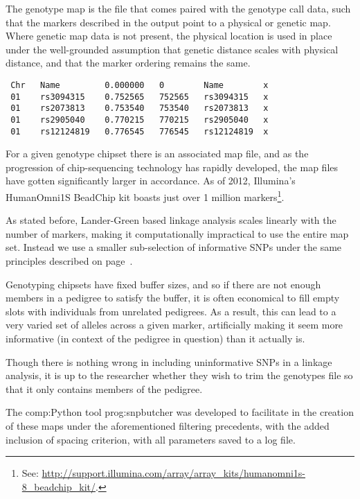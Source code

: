 The genotype map is the file that comes paired with the genotype call data, such that the markers described in the output point to a physical or genetic map. Where genetic map data is not present, the physical location is used in place under the well-grounded assumption that genetic distance scales with physical distance, and that the marker ordering remains the same.

\begingroup
\vspace{10pt}
\begin{lstlisting}
 Chr   Name         0.000000   0        Name        x
 01    rs3094315    0.752565   752565   rs3094315   x
 01    rs2073813    0.753540   753540   rs2073813   x
 01    rs2905040    0.770215   770215   rs2905040   x
 01    rs12124819   0.776545   776545   rs12124819  x
\end{lstlisting}
\vspace{-10pt}
\endgroup

For a given genotype chipset there is an associated map file, and as the progression of chip-sequencing technology has rapidly developed, the map files have gotten significantly larger in accordance. As of 2012, Illumina's HumanOmni1S BeadChip kit boasts just over 1 million markers\footnote{See: \url{http://support.illumina.com/array/array_kits/humanomni1s-8_beadchip_kit/}.}.

As stated before, Lander-Green based linkage analysis scales linearly with the number of markers, making it computationally impractical to use the entire map set. Instead we use a smaller sub-selection of informative SNPs under the same principles described on page~\pageref{informativemarkers}.

Genotyping chipsets have fixed buffer sizes, and so if there are not enough members in a pedigree to satisfy the buffer, it is often economical to fill empty slots with individuals from unrelated pedigrees. As a result, this can lead to a very varied set of alleles across a given marker, artificially making it seem more informative (in context of the pedigree in question) than it actually is.

Though there is nothing wrong in including uninformative SNPs in a linkage analysis, it is up to the researcher whether they wish to trim the genotypes file so that it only contains members of the pedigree.

The \gls{comp:Python} tool \gls{prog:snpbutcher} was developed to facilitate in the creation of these maps under the aforementioned filtering precedents, with the added inclusion of spacing criterion, with all parameters saved to a log file.

